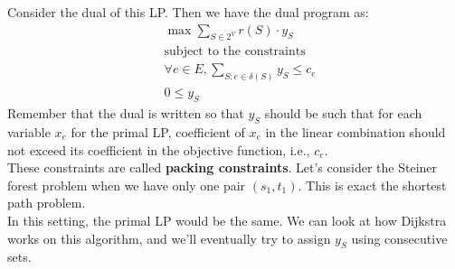 \documentclass[a4paper]{article}
\newcommand{\nl}{\vspace{0.2cm}\\}
\begin{document}
Consider the dual of this LP. Then we have the dual program as:
\begin{align*}
    &\max \sum_{S \in 2^V} r(S) \cdot y_S\\
    &\text{subject to the constraints}\\
    &\forall e \in E, \sum_{S : e \in \delta(S)} y_S \le c_e\\
    &0 \le y_S
\end{align*}
Remember that the dual is written so that $y_S$ should be such that for each variable $x_e$ for the primal LP, coefficient of $x_e$ in the linear combination should not exceed its coefficient in
the objective function, i.e., $c_e$.\nl
These constraints are called \textbf{packing constraints}. Let's consider the Steiner forest problem when we have only one pair $(s_1, t_1)$. This is exact the shortest path problem.\nl
In this setting, the primal LP would be the same. We can look at how Dijkstra works on this algorithm, and we'll eventually try to assign $y_S$ using consecutive sets.\nl
\end{document}
